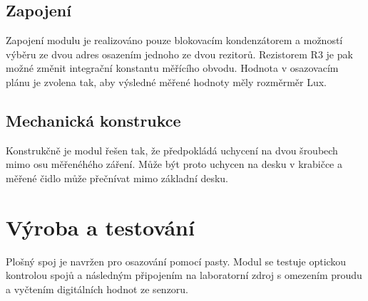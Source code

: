 \documentclass[12pt,a4paper,oneside]{article}
\begin{document}
\subsection{Zapojení}

Zapojení modulu je realizováno pouze blokovacím kondenzátorem a možností výběru ze dvou adres osazením jednoho ze dvou rezitorů. Rezistorem R3 je pak možné změnit integrační konstantu měřícího obvodu. Hodnota v osazovacím plánu je zvolena tak, aby výsledné měřené hodnoty měly rozměrměr Lux. 



\subsection{Mechanická konstrukce}

Konstrukčně je modul řešen tak, že předpokládá uchycení na dvou šroubech mimo osu měřenéhého záření. Může být proto uchycen na desku v krabičce a měřené čidlo může přečnívat mimo základní desku. 

\section{Výroba a testování}

Plošný spoj je navržen pro osazování pomocí pasty.  Modul se testuje optickou kontrolou spojů a následným připojením na laboratorní zdroj s omezením proudu a  vyčtením digitálních hodnot ze senzoru. 

\newpage
\end{document}
